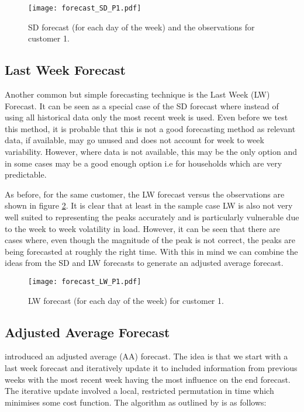 \begin{figure}
\centering
\texttt{[image: forecast\_SD\_P1.pdf]}
\caption{SD forecast (for each day of the week) and the observations for customer 1.}
\label{fig:SDforecast} 
\end{figure}

\subsection{Last Week Forecast}

Another common but simple forecasting technique is the Last Week (LW) Forecast. It can be seen as a special case of the SD forecast where instead of using all historical data only the most recent week is used. Even before we test this method, it is probable that this is not a good forecasting method as relevant data, if available, may go unused and does not account for week to week variability. However, where data is not available, this may be the only option and in some cases may be a good enough option i.e for households which are very predictable.

As before, for the same customer, the LW forecast versus the observations are shown in figure \ref{fig:LW_forecast_P1}. It is clear that at least in the sample case LW is also not very well suited to representing the peaks accurately and is particularly vulnerable due to the week to week volatility in load. However, it can be seen that there are cases where, even though the magnitude of the peak is not correct, the peaks are being forecasted at roughly the right time. With this in mind we can combine the ideas from the SD and LW forecasts to generate an adjusted average forecast.

\begin{figure}
\texttt{[image: forecast\_LW\_P1.pdf]}
\caption{LW forecast (for each day of the week) for customer 1.}
\label{fig:LW_forecast_P1} 
\end{figure}

\subsection{Adjusted Average Forecast}

\cite{dan14} introduced an adjusted average (AA) forecast. The idea is that we start with a last week forecast and iteratively update it to included information from previous weeks with the most recent week having the most influence on the end forecast. The iterative update involved a local, restricted permutation in time which minimises some cost function. The algorithm as outlined by \cite{dan14} is as follows:

